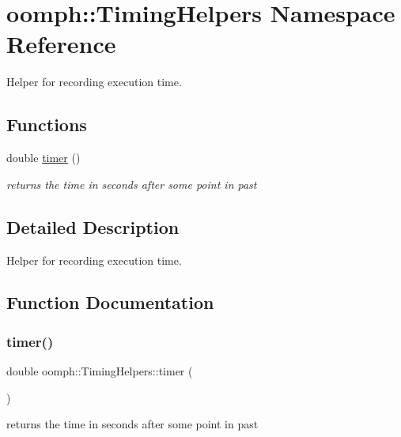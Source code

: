 \hypertarget{namespaceoomph_1_1TimingHelpers}{}\section{oomph\+:\+:Timing\+Helpers Namespace Reference}
\label{namespaceoomph_1_1TimingHelpers}


Helper for recording execution time.  


\subsection*{Functions}
\begin{DoxyCompactItemize}
\item 
double \hyperlink{namespaceoomph_1_1TimingHelpers_a9fb6ad7e2e01b0914e9f7072ef9ebfa6}{timer} ()
\begin{DoxyCompactList}\small\item\em returns the time in seconds after some point in past \end{DoxyCompactList}\end{DoxyCompactItemize}


\subsection{Detailed Description}
Helper for recording execution time. 

\subsection{Function Documentation}
\mbox{\label{namespaceoomph_1_1TimingHelpers_a9fb6ad7e2e01b0914e9f7072ef9ebfa6}} 
\subsubsection{\texorpdfstring{timer()}{timer()}}
{\footnotesize\ttfamily double oomph\+::\+Timing\+Helpers\+::timer (\begin{DoxyParamCaption}{ }\end{DoxyParamCaption})}



returns the time in seconds after some point in past 



